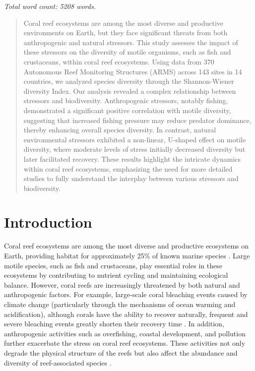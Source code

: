 \documentclass[a4paper, 11]{article}
\begin{document}
\pagebreak

\textit{Total word count: 5208 words.}

\doublespacing

\begin{abstract}
Coral reef ecosystems are among the most diverse and productive environments on Earth, but they face significant threats from both anthropogenic and natural stressors. This study assesses the impact of these stressors on the diversity of motile organisms, such as fish and crustaceans, within coral reef ecosystems. Using data from 370 Autonomous Reef Monitoring Structures (ARMS) across 143 sites in 14 countries, we analyzed species diversity through the Shannon-Wiener diversity Index. Our analysis revealed a complex relationship between stressors and biodiversity. Anthropogenic stressors, notably fishing, demonstrated a significant positive correlation with motile diversity, suggesting that increased fishing pressure may reduce predator dominance, thereby enhancing overall species diversity. In contrast, natural environmental stressors exhibited a non-linear, U-shaped effect on motile diversity, where moderate levels of stress initially decreased diversity but later facilitated recovery. These results highlight the intricate dynamics within coral reef ecosystems, emphasizing the need for more detailed studies to fully understand the interplay between various stressors and biodiversity.
\end{abstract}

\section{Introduction}

Coral reef ecosystems are among the most diverse and productive ecosystems on Earth, providing habitat for approximately 25\% of known marine species \citep{hoegh2017coral}. Large motile species, such as fish and crustaceans, play essential roles in these ecosystems by contributing to nutrient cycling and maintaining ecological balance. However, coral reefs are increasingly threatened by both natural and anthropogenic factors. For example, large-scale coral bleaching events caused by climate change (particularly through the mechanisms of ocean warming and acidification), although corals have the ability to recover naturally, frequent and severe bleaching events greatly shorten their recovery time \citep{knowlton2001future, bostrom2020coral}. In addition, anthropogenic activities such as overfishing, coastal development, and pollution further exacerbate the stress on coral reef ecosystems. These activities not only degrade the physical structure of the reefs but also affect the abundance and diversity of reef-associated species \citep{hoegh2017coral}.
\end{document}
